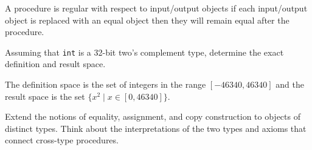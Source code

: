 \begin{solution}
	A procedure is regular with respect to input/output objects if each input/output object is replaced
	with an equal object then they will remain equal after the procedure.
\end{solution}

\begin{exercise}
	Assuming that \verb|int| is a 32-bit two's complement type, determine the exact definition and result space.
\end{exercise}

\begin{solution}
	The definition space is the set of integers in the range $[-46340, 46340]$ and the result space is
	the set $\{ x^2 \mid x \in [0, 46340] \}$.
\end{solution}

\begin{project}
	Extend the notions of equality, assignment, and copy construction to objects of distinct types. Think
	about the interpretations of the two types and axioms that connect cross-type procedures.
\end{project}
